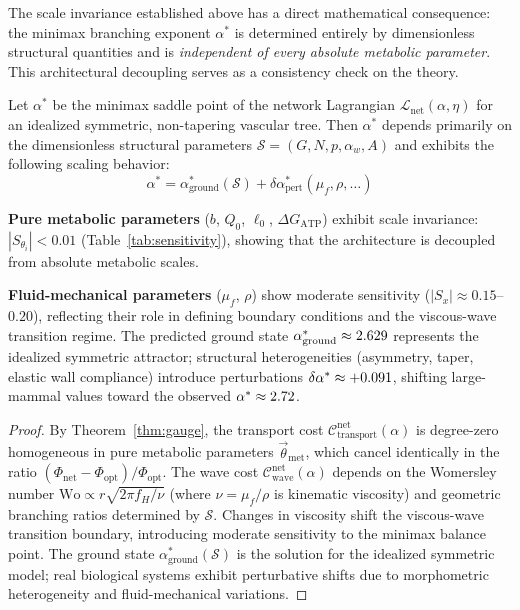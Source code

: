The scale invariance established above has a direct mathematical consequence:
the minimax branching exponent $\alpha^*$ is determined entirely by
dimensionless structural quantities and is \emph{independent of every absolute
metabolic parameter}. This architectural decoupling serves as a consistency
check on the theory.

\begin{corollary}
\label{thm:rigidity}
Let $\alpha^*$ be the minimax saddle point of the network Lagrangian
$\mathcal{L}_{\mathrm{net}}(\alpha,\eta)$ for an idealized symmetric,
non-tapering vascular tree. Then $\alpha^*$ depends primarily on the
dimensionless structural parameters $\mathcal{S} = (G, N, p, \alpha_w, A)$ and
exhibits the following scaling behavior:
\begin{equation}
    \alpha^* = \alpha^*_{\mathrm{ground}}(\mathcal{S}) + \delta\alpha^*_{\mathrm{pert}}(\mu_f, \rho, \dots)
    \label{eq:ground_state}
\end{equation}

\textbf{Pure metabolic parameters} ($b$, $Q_0$, $\ell_0$, $\Delta
G_{\mathrm{ATP}}$) exhibit scale invariance: $|S_{\theta_i}| < 0.01$
(Table~\ref{tab:sensitivity}), showing that the architecture is decoupled
from absolute metabolic scales.

\textbf{Fluid-mechanical parameters} ($\mu_f$, $\rho$) show moderate sensitivity
($|S_x| \approx 0.15$--$0.20$), reflecting their role in defining boundary
conditions and the viscous-wave transition regime. The predicted ground state
$\alpha^*_{\mathrm{ground}} \approx 2.629$ represents the idealized
symmetric attractor; structural heterogeneities (asymmetry, taper, elastic wall
compliance) introduce perturbations $\delta\alpha^* \approx +0.091$,
shifting large-mammal values toward the observed $\alpha^* \approx
2.72$.
\end{corollary}

\begin{proof}
By Theorem~\ref{thm:gauge}, the transport cost
$\mathcal{C}_{\mathrm{transport}}^{\mathrm{net}}(\alpha)$ is degree-zero
homogeneous in pure metabolic parameters $\vec{\theta}_{\mathrm{met}}$, which
cancel identically in the ratio $(\Phi_{\mathrm{net}} -
\Phi_{\mathrm{opt}})/\Phi_{\mathrm{opt}}$. The wave cost
$\mathcal{C}_{\mathrm{wave}}^{\mathrm{net}}(\alpha)$ depends on the Womersley
number $\mathrm{Wo} \propto r \sqrt{2\pi f_H / \nu}$ (where $\nu = \mu_f/\rho$
is kinematic viscosity) and geometric branching ratios determined by
$\mathcal{S}$. Changes in viscosity shift the viscous-wave transition boundary,
introducing moderate sensitivity to the minimax balance point. The ground state
$\alpha^*_{\mathrm{ground}}(\mathcal{S})$ is the solution for the idealized
symmetric model; real biological systems exhibit perturbative shifts due to
morphometric heterogeneity and fluid-mechanical variations.
\end{proof}

